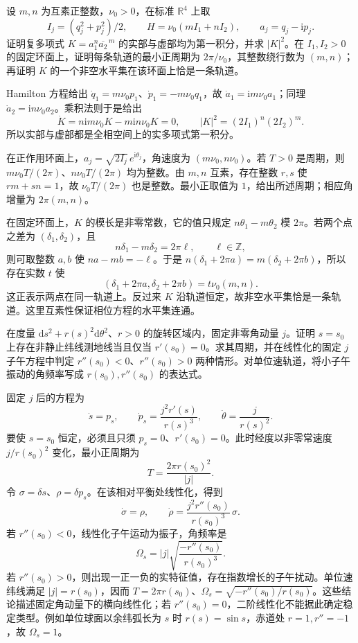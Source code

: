 \begin{exercise}\label{g4:ex:1104:resonant-polynomial}
	设 \(m,n\) 为互素正整数，\(\nu_0>0\)，在标准 \(\mathbb R^4\) 上取
	\[
		I_j=(q_j^2+p_j^2)/2,\qquad
		H=\nu_0(mI_1+nI_2),\qquad
		a_j=q_j-\mathrm{i}p_j.
	\]
	证明复多项式 \(K=a_1^n\overline{a_2}^{\,m}\) 的实部与虚部均为第一积分，并求 \(|K|^2\)。在 \(I_1,I_2>0\) 的固定环面上，证明每条轨道的最小正周期为 \(2\pi/\nu_0\)，其整数绕行数为 \((m,n)\)；再证明 \(K\) 的一个非空水平集在该环面上恰是一条轨道。
\end{exercise}
\begin{solution}
	Hamilton 方程给出 \(\dot q_1=m\nu_0p_1\)、\(\dot p_1=-m\nu_0q_1\)，故 \(\dot a_1=\mathrm{i}m\nu_0a_1\)；同理 \(\dot a_2=\mathrm{i}n\nu_0a_2\)。乘积法则于是给出
	\[
		\dot K
		=n\mathrm{i}m\nu_0K-m\mathrm{i}n\nu_0K=0,
		\qquad |K|^2=(2I_1)^n(2I_2)^m.
	\]
	所以实部与虚部都是全相空间上的实多项式第一积分。

	在正作用环面上，\(a_j=\sqrt{2I_j}\,e^{\mathrm{i}\theta_j}\)，角速度为 \((m\nu_0,n\nu_0)\)。若 \(T>0\) 是周期，则 \(m\nu_0T/(2\pi)\)、\(n\nu_0T/(2\pi)\) 均为整数。由 \(m,n\) 互素，存在整数 \(r,s\) 使 \(rm+sn=1\)，故 \(\nu_0T/(2\pi)\) 也是整数。最小正取值为 \(1\)，给出所述周期；相应角增量为 \(2\pi(m,n)\)。

	在固定环面上，\(K\) 的模长是非零常数，它的值只规定 \(n\theta_1-m\theta_2\) 模 \(2\pi\)。若两个点之差为 \((\delta_1,\delta_2)\)，且
	\[
		n\delta_1-m\delta_2=2\pi\ell,\qquad \ell\in\mathbb Z,
	\]
	则可取整数 \(a,b\) 使 \(na-mb=-\ell\)。于是 \(n(\delta_1+2\pi a)=m(\delta_2+2\pi b)\)，所以存在实数 \(t\) 使
	\[
		(\delta_1+2\pi a,\delta_2+2\pi b)=t\nu_0(m,n).
	\]
	这正表示两点在同一轨道上。反过来 \(K\) 沿轨道恒定，故非空水平集恰是一条轨道。这里互素性保证相位方程的水平集连通。
\end{solution}

\begin{exercise}\label{g4:ex:1104:latitude-stability}
	在度量 \(\mathrm{d}s^2+r(s)^2\mathrm{d}\theta^2\)、\(r>0\) 的旋转区域内，固定非零角动量 \(j\)。证明 \(s=s_0\) 上存在非静止纬线测地线当且仅当 \(r'(s_0)=0\)。求其周期，并在线性化的固定 \(j\) 子午方程中判定 \(r''(s_0)<0\)、\(r''(s_0)>0\) 两种情形。对单位速轨道，将小子午振动的角频率写成 \(r(s_0),r''(s_0)\) 的表达式。
\end{exercise}
\begin{solution}
	固定 \(j\) 后的方程为
	\[
		\dot s=p_s,\qquad
		\dot p_s=\frac{j^2r'(s)}{r(s)^3},\qquad
		\dot\theta=\frac{j}{r(s)^2}.
	\]
	要使 \(s=s_0\) 恒定，必须且只须 \(p_s=0\)、\(r'(s_0)=0\)。此时经度以非零常速度 \(j/r(s_0)^2\) 变化，最小正周期为
	\[
		T=\frac{2\pi r(s_0)^2}{|j|}.
	\]
	令 \(\sigma=\delta s\)、\(\rho=\delta p_s\)。在该相对平衡处线性化，得到
	\[
		\dot\sigma=\rho,\qquad
		\dot\rho=\frac{j^2r''(s_0)}{r(s_0)^3}\,\sigma.
	\]
	若 \(r''(s_0)<0\)，线性化子午运动为振子，角频率是
	\[
		\Omega_s=|j|\sqrt{\frac{-r''(s_0)}{r(s_0)^3}}.
	\]
	若 \(r''(s_0)>0\)，则出现一正一负的实特征值，存在指数增长的子午扰动。单位速纬线满足 \(|j|=r(s_0)\)，因而 \(T=2\pi r(s_0)\)、\(\Omega_s=\sqrt{-r''(s_0)/r(s_0)}\)。这些结论描述固定角动量下的横向线性化；若 \(r''(s_0)=0\)，二阶线性化不能据此确定稳定类型。例如单位球面以余纬弧长为 \(s\) 时 \(r(s)=\sin s\)，赤道处 \(r=1,r''=-1\)，故 \(\Omega_s=1\)。
\end{solution}

